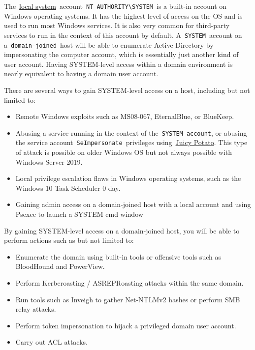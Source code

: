 The \href{https://docs.microsoft.com/en-us/windows/win32/services/localsystem-account}{local system} account \verb|NT AUTHORITY\SYSTEM| is a built-in account on Windows operating systems. It has the highest level of access on the OS and is used to run most Windows services. It is also very common for third-party services to run in the context of this account by default. A \verb|SYSTEM| account on a \verb|domain-joined| host will be able to enumerate Active Directory by impersonating the computer account, which is essentially just another kind of user account. Having SYSTEM-level access within a domain environment is nearly equivalent to having a domain user account.

There are several ways to gain SYSTEM-level access on a host, including but not limited to:

\begin{itemize}
    \item Remote Windows exploits such as MS08-067, EternalBlue, or BlueKeep.
    \item Abusing a service running in the context of the \verb|SYSTEM account|, or abusing the service account \verb|SeImpersonate| privileges using \href{https://github.com/ohpe/juicy-potato}{Juicy Potato}. This type of attack is possible on older Windows OS but not always possible with Windows Server 2019.
    \item Local privilege escalation flaws in Windows operating systems, such as the Windows 10 Task Scheduler 0-day.
    \item Gaining admin access on a domain-joined host with a local account and using Psexec to launch a SYSTEM cmd window
\end{itemize}
By gaining SYSTEM-level access on a domain-joined host, you will be able to perform actions such as but not limited to:

\begin{itemize}
    \item Enumerate the domain using built-in tools or offensive tools such as BloodHound and PowerView.
    \item Perform Kerberoasting / ASREPRoasting attacks within the same domain.
    \item Run tools such as Inveigh to gather Net-NTLMv2 hashes or perform SMB relay attacks.
    \item Perform token impersonation to hijack a privileged domain user account.
    \item Carry out ACL attacks.
\end{itemize}

